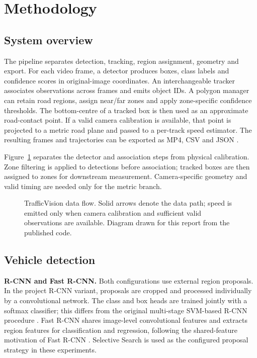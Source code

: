 \section{Methodology}
\label{sec:methods}
\subsection{System overview}
The pipeline separates detection, tracking, region assignment, geometry and export. For each video frame, a detector produces boxes, class labels and confidence scores in original-image coordinates. An interchangeable tracker associates observations across frames and emits object IDs. A polygon manager can retain road regions, assign near/far zones and apply zone-specific confidence thresholds. The bottom-centre of a tracked box is then used as an approximate road-contact point. If a valid camera calibration is available, that point is projected to a metric road plane and passed to a per-track speed estimator. The resulting frames and trajectories can be exported as MP4, CSV and JSON \cite{architecture}.

Figure~\ref{fig:pipeline} separates the detector and association steps from physical calibration. Zone filtering is applied to detections before association; tracked boxes are then assigned to zones for downstream measurement. Camera-specific geometry and valid timing are needed only for the metric branch.
\begin{figure}[htbp]
\centering

\caption{TrafficVision data flow. Solid arrows denote the data path; speed is emitted only when camera calibration and sufficient valid observations are available. Diagram drawn for this report from the published code.}
\label{fig:pipeline}
\end{figure}

\subsection{Vehicle detection}
\textbf{R-CNN and Fast R-CNN.} Both configurations use external region proposals. In the project R-CNN variant, proposals are cropped and processed individually by a convolutional network. The class and box heads are trained jointly with a softmax classifier; this differs from the original multi-stage SVM-based R-CNN procedure \cite{rcnn}. Fast R-CNN shares image-level convolutional features and extracts region features for classification and regression, following the shared-feature motivation of Fast R-CNN \cite{fast}. Selective Search is used as the configured proposal strategy in these experiments.

